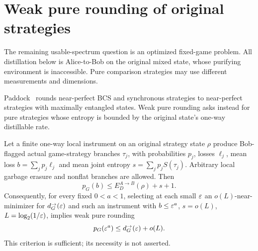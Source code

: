 \section{Weak pure rounding of original strategies}\label{sec:weak-rounding}
The remaining usable-spectrum question is an optimized fixed-game problem. All distillation below is Alice-to-Bob on the original mixed state, whose purifying environment is inaccessible. Pure comparison strategies may use different measurements and dimensions.

Paddock~\cite[Corollary~1.3]{Pad22} rounds near-perfect BCS and synchronous strategies to near-perfect strategies with maximally entangled states. Weak pure rounding asks instead for pure strategies whose entropy is bounded by the original state's one-way distillable rate.

\begin{proposition}\label{prop:weak-rounding-criterion}
Let a finite one-way local instrument on an original strategy state $\rho$ produce Bob-flagged actual game-strategy branches $\tau_j$, with probabilities $p_j$, losses $\ell_j$, mean loss $b=\sum_jp_j\ell_j$ and mean joint entropy $s=\sum_jp_jS(\tau_j)$. Arbitrary local garbage erasure and nonflat branches are allowed. Then
\[
 p_G(b)\le E_D^{A\to B}(\rho)+s+1.
\]
Consequently, for every fixed $0<a<1$, selecting at each small $\varepsilon$ an $o(L)$-near-minimizer for $d_G^\to(\varepsilon)$ and such an instrument with $b\le\varepsilon^a$, $s=o(L)$, $L=\log_2(1/\varepsilon)$, implies weak pure rounding
\[
 p_G(\varepsilon^a)\le d_G^\to(\varepsilon)+o(L).
\]
This criterion is sufficient; its necessity is not asserted.
\end{proposition}
